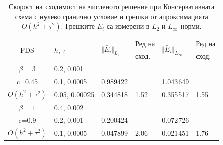 \documentclass{article}
\begin{document}
\begin{table}[ht]
\centering
\small
		\begin{tabular}{||c|l|ll|ll||}
			\hline
			\hline
      \multirow{2  }{*}{FDS}        & \multirow{2  }{*}{$h$, $\tau$}  &	\multirow{2  }{*}{  $\Vert \bar E_i \Vert_{L_2} $ } 	&Ред на & \multirow{2  }{*}{  $\Vert \bar E_i \Vert_{L_\infty}$ }	&Ред на   \\
	                                        &                                                &    										&  сход. & 										& сход. \\
   			\hline 
					\hline 
  $\beta=3$                &0.2, 0.001         &                    &                &                  &                   \\
   c=0.45                     &0.1, 0.0005         & 0.989422   &                & 1.043649  &                   \\
     $O(h^2 + \tau^ 2)$ &0.05, 0.00025  &0.344818    & 1.52       & 0.355517   &   1.55   \\
	   \hline
			\hline 
       $\beta=1$           & 0.4, 0.002       &                   &           &                 &   \\
                  c=0.9       & 0.2, 0.001        & 0.200424   &          &0.072726  &   \\
  $O(h^2+ \tau^2)$  & 0.1, 0.0005       & 0.047899   & 2.06  &0.021451  & 1.76 \\
	   \hline
			\hline 
		\end{tabular}
		\caption{Скорост на сходимост на численото решение при Консервативната схема с нулево гранично условие и грешки от апроксимацията $O(h^{2} + \tau^2 )$. Грешките $\bar E_i$ са измерени в $L_2$ и $L_\infty$ норми.}
\label{tableC}
\end{table}
\end{document}
